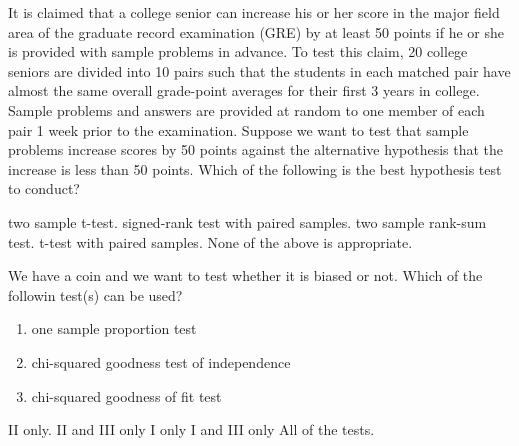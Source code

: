 \documentclass[letterpaper,10pt,addpoints]{exam}
\begin{document}
\begin{questions}
\question It is claimed that a college senior can increase his or her score in the major field area of the graduate record examination (GRE) by at least 50 points if he or she is provided with sample problems in advance. To test this claim, 20 college seniors are divided into 10 pairs such that the students in each matched pair have almost the same overall grade-point averages for their first 3 years in college. Sample problems and answers are provided at random to one member of each pair 1 week prior to the examination. Suppose we want to test that sample problems increase scores by 50 points against the alternative hypothesis that the increase is less than 50 points. Which of the following is the best hypothesis test to conduct?
\begin{choices}
  \choice two sample t-test.
  \correctchoice signed-rank test with paired samples.
  \choice two sample rank-sum test.
  \choice t-test with paired samples.
  \choice None of the above is appropriate.
\end{choices}

\question We have a coin and we want to test whether it is biased or not. Which of the followin test(s) can be used?
\begin{enumerate}[I]
  \item one sample proportion test
  \item chi-squared goodness test of independence
  \item chi-squared goodness of fit test
\end{enumerate}
\begin{choices}
  \choice II only.
  \choice II and III only
  \choice I only
  \correctchoice I and III only
  \choice All of the tests.
\end{choices}


\end{questions}
\end{document}
